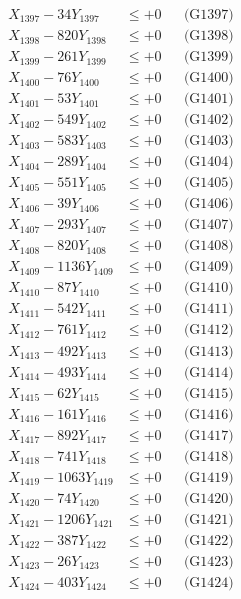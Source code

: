 \documentclass[a4paper,10pt]{article}
\begin{document}
{\begin{align}
X_{1397} - 34Y_{1397} &\leq +0 && \text{(G1397)} \\
X_{1398} - 820Y_{1398} &\leq +0 && \text{(G1398)} \\
X_{1399} - 261Y_{1399} &\leq +0 && \text{(G1399)} \\
X_{1400} - 76Y_{1400} &\leq +0 && \text{(G1400)} \\
\allowbreak
X_{1401} - 53Y_{1401} &\leq +0 && \text{(G1401)} \\
X_{1402} - 549Y_{1402} &\leq +0 && \text{(G1402)} \\
X_{1403} - 583Y_{1403} &\leq +0 && \text{(G1403)} \\
X_{1404} - 289Y_{1404} &\leq +0 && \text{(G1404)} \\
X_{1405} - 551Y_{1405} &\leq +0 && \text{(G1405)} \\
X_{1406} - 39Y_{1406} &\leq +0 && \text{(G1406)} \\
X_{1407} - 293Y_{1407} &\leq +0 && \text{(G1407)} \\
X_{1408} - 820Y_{1408} &\leq +0 && \text{(G1408)} \\
X_{1409} - 1136Y_{1409} &\leq +0 && \text{(G1409)} \\
X_{1410} - 87Y_{1410} &\leq +0 && \text{(G1410)} \\
\allowbreak
X_{1411} - 542Y_{1411} &\leq +0 && \text{(G1411)} \\
X_{1412} - 761Y_{1412} &\leq +0 && \text{(G1412)} \\
X_{1413} - 492Y_{1413} &\leq +0 && \text{(G1413)} \\
X_{1414} - 493Y_{1414} &\leq +0 && \text{(G1414)} \\
X_{1415} - 62Y_{1415} &\leq +0 && \text{(G1415)} \\
X_{1416} - 161Y_{1416} &\leq +0 && \text{(G1416)} \\
X_{1417} - 892Y_{1417} &\leq +0 && \text{(G1417)} \\
X_{1418} - 741Y_{1418} &\leq +0 && \text{(G1418)} \\
X_{1419} - 1063Y_{1419} &\leq +0 && \text{(G1419)} \\
X_{1420} - 74Y_{1420} &\leq +0 && \text{(G1420)} \\
\allowbreak
X_{1421} - 1206Y_{1421} &\leq +0 && \text{(G1421)} \\
X_{1422} - 387Y_{1422} &\leq +0 && \text{(G1422)} \\
X_{1423} - 26Y_{1423} &\leq +0 && \text{(G1423)} \\
X_{1424} - 403Y_{1424} &\leq +0 && \text{(G1424)} \\

\end{align}}
\end{document}
